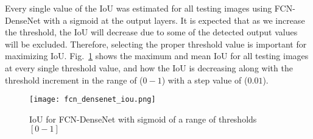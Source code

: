 	Every single value of the IoU was estimated for all testing images using FCN-DenseNet with a sigmoid at the output layers.
	It is expected that  as we increase the threshold, the IoU will decrease due to some of the detected output values will be excluded.
	Therefore, selecting the proper threshold value is important for maximizing IoU. 
	Fig.~\ref{fig:iou_fcn} shows the maximum and mean IoU for all testing images at every single threshold value, and how the IoU is decreasing along with the threshold increment in the range of (\(0-1\)) with a step value of (\(0.01\)).
	\begin{figure}[!h] 
		\centering
		\texttt{[image: fcn\_densenet\_iou.png]}
		\centering
		\caption{IoU for FCN-DenseNet with sigmoid of a range of thresholds \([0-1]\)} 
		\label{fig:iou_fcn}
	\end{figure}
	
